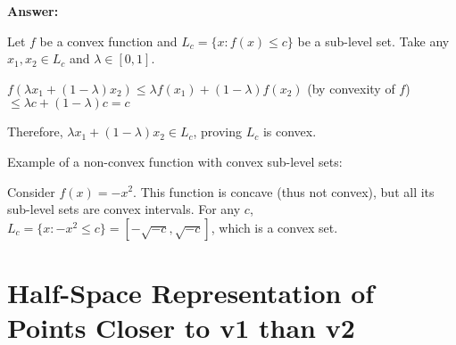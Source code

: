 \documentclass{article}
\newenvironment{answer}
    {\par\noindent\textbf{Answer:}\par}
    {\par}
\begin{document}
\begin{enumerate}
\begin{enumerate}
\begin{enumerate}
\begin{answer}
        Let $f$ be a convex function and $L_c = \{x : f(x) \leq c\}$ be a sub-level set.
        Take any $x_1, x_2 \in L_c$ and $\lambda \in [0,1]$.
        
        $f(\lambda x_1 + (1-\lambda)x_2) \leq \lambda f(x_1) + (1-\lambda)f(x_2)$ (by convexity of $f$)
        $\leq \lambda c + (1-\lambda)c = c$
        
        Therefore, $\lambda x_1 + (1-\lambda)x_2 \in L_c$, proving $L_c$ is convex.
        
        Example of a non-convex function with convex sub-level sets:
        
        Consider $f(x) = -x^2$. This function is concave (thus not convex), but all its sub-level sets are convex intervals. For any $c$, $L_c = \{x : -x^2 \leq c\} = [-\sqrt{-c}, \sqrt{-c}]$, which is a convex set.
        \end{answer}
    \end{enumerate}
\end{enumerate}


\end{enumerate}

\section{Half-Space Representation of Points Closer to v1 than v2}
\end{document}
